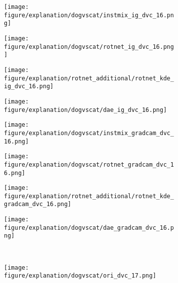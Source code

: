 \documentclass{article} \usepackage{iclr2021_conference,times}
\begin{document}
\begin{figure}[h!]
\hspace{-2mm}
\begin{subfigure}{.11\textwidth}
  \centering
  \texttt{[image: figure/explanation/dogvscat/instmix\_ig\_dvc\_16.png]}
\end{subfigure}
\hspace{-2mm}
\begin{subfigure}{.11\textwidth}
  \centering
  \texttt{[image: figure/explanation/dogvscat/rotnet\_ig\_dvc\_16.png]}
\end{subfigure}
\hspace{-2mm}
\begin{subfigure}{.11\textwidth}
  \centering
  \texttt{[image: figure/explanation/rotnet\_additional/rotnet\_kde\_ig\_dvc\_16.png]}
\end{subfigure}
\hspace{-2mm}
\begin{subfigure}{.11\textwidth}
  \centering
  \texttt{[image: figure/explanation/dogvscat/dae\_ig\_dvc\_16.png]}
\end{subfigure}
\hspace{-2mm}
\begin{subfigure}{.11\textwidth}
  \centering
  \texttt{[image: figure/explanation/dogvscat/instmix\_gradcam\_dvc\_16.png]}
\end{subfigure}
\hspace{-2mm}
\begin{subfigure}{.11\textwidth}
  \centering
  \texttt{[image: figure/explanation/dogvscat/rotnet\_gradcam\_dvc\_16.png]}
\end{subfigure}
\hspace{-2mm}
\begin{subfigure}{.11\textwidth}
  \centering
  \texttt{[image: figure/explanation/rotnet\_additional/rotnet\_kde\_gradcam\_dvc\_16.png]}
\end{subfigure}
\hspace{-2mm}
\begin{subfigure}{.11\textwidth}
  \centering
  \texttt{[image: figure/explanation/dogvscat/dae\_gradcam\_dvc\_16.png]}
\end{subfigure}\\
\begin{subfigure}{.11\textwidth}
  \centering
  \texttt{[image: figure/explanation/dogvscat/ori\_dvc\_17.png]}
\end{subfigure}
\hspace{-2mm}

\end{figure}
\end{document}
